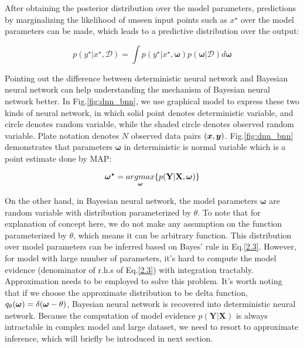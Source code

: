 After obtaining the posterior distribution over the model parameters, predictions by marginalizing the likelihood of unseen input points such as $x^{\star}$ over the model parameters can be made, which leads to a predictive distribution over the output:

\begin{equation}
p(y^{\star}|x^{\star}, \mathcal D) = \int p(y^{\star}|x^{\star}, \boldsymbol{\omega})p(\boldsymbol{\omega}|\mathcal D)d\boldsymbol{\omega}
\label{2.4}
\end{equation}

Pointing out the difference between deterministic neural network and Bayesian neural network can help understanding the mechanism of Bayesian neural network better. In Fig.\ref{fig:dnn_bnn}, we use graphical model to express these two kinds of neural network, in which solid point denotes deterministic variable, and circle denotes random variable, while the shaded circle denotes observed random variable. Plate notation denotes $N$ observed data pairs $(\boldsymbol x, \boldsymbol y)$. Fig.\ref{fig:dnn_bnn} demonstrates that parameters $\boldsymbol{\omega}$ in deterministic is normal variable which is a point estimate done by MAP:

\begin{equation}
\boldsymbol{\omega^{\star}} = \underset{\boldsymbol \omega}{argmax}\{p(\mathbf{Y}|\mathbf{X}, \boldsymbol{\omega})\}\label{2.5}
\end{equation}

On the other hand, in Bayesian neural network, the model parameters $\boldsymbol{\omega}$ are random variable with distribution parameterized by $\theta$. To note that for explanation of concept here, we do not make any assumption on the function parameterized by $\theta$, which means it can be arbitrary function. This distribution over model parameters can be inferred based on Bayes' rule in Eq.\ref{2.3}. However, for model with large number of parameters, it's hard to compute the model evidence (denominator of r.h.s of Eq.\ref{2.3}) with integration tractably. Approximation needs to be employed to solve this problem. It's worth noting that if we choose the approximate distribution to be delta function, $q_{\theta}(\boldsymbol \omega) = \delta(\boldsymbol \omega - \theta)$, Bayesian neural network is recovered into deterministic neural network. Because the computation of model evidence $p(\mathbf{Y}|\mathbf{X})$ is always intractable in complex model and large dataset, we need to resort to approximate inference, which will briefly be introduced in next section.

